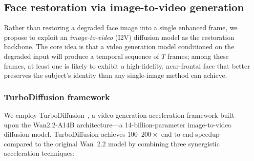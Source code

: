 %

\subsection{Face restoration via image-to-video generation}
\label{subsec:i2v_method}

Rather than restoring a degraded face image into a single enhanced
frame, we propose to exploit an \emph{image-to-video} (I2V) diffusion
model as the restoration backbone.  The core idea is that a video
generation model conditioned on the degraded input will produce a
temporal sequence of $T$ frames; among these frames, at least one is
likely to exhibit a high-fidelity, near-frontal face that better
preserves the subject's identity than any single-image method can
achieve.

\subsubsection{TurboDiffusion framework}
\label{subsubsec:turbodiffusion}

We employ TurboDiffusion~\cite{TurboDiffusion}, a video generation
acceleration framework built upon the Wan2.2-A14B
architecture---a 14-billion-parameter image-to-video diffusion
model.  TurboDiffusion achieves $100$--$200 \times$ end-to-end
speedup compared to the original Wan~2.2 model by combining
three synergistic acceleration techniques:

